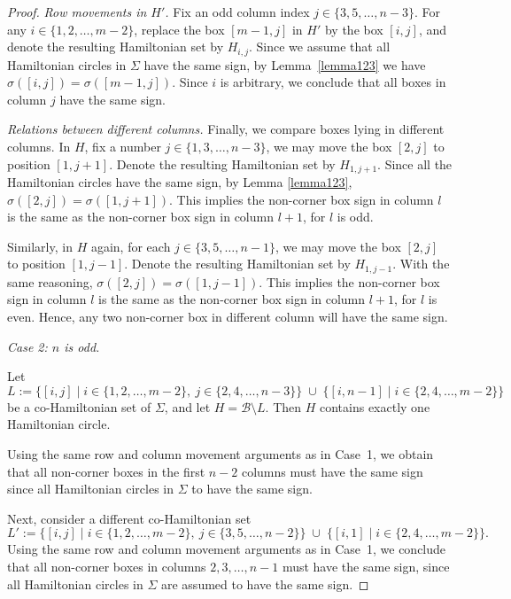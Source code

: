 \documentclass[12pt]{amsart}
\theoremstyle{theorem}%
\theoremstyle{definition}%
\begin{document}
\begin{proof}
\medskip
\noindent\emph{Row movements in $H'$.}
Fix an odd column index $j\in\{3,5,\dots,n-3\}$.
For any $i\in\{1,2,\dots,m-2\}$, replace the box $[m-1,j]$ in $H'$
by the box $[i,j]$, and denote the resulting Hamiltonian set by $H_{i,j}$. Since we assume that all Hamiltonian circles in $\Sigma$ have the same sign, by Lemma~\ref{lemma123} we have
$\sigma([i,j])=\sigma([m-1,j])$.
Since $i$ is arbitrary, we conclude that all boxes in column $j$ have the same sign.


\medskip
\noindent\emph{Relations between different columns.}
Finally, we compare boxes lying in different columns.
In $H$, fix a number $j\in\{1,3,\dots,n-3\}$, we may move the box $[2,j]$
to position $[1,j+1]$. Denote the resulting Hamiltonian set by $H_{1,j+1}$. Since all the Hamiltonian circles have the same sign, 
by Lemma \ref{lemma123}, $\sigma([2,j])=\sigma([1,j+1])$. This implies the non-corner box sign in column $l$ is the same as the non-corner box sign in column $l+1$, for $l$ is odd.

Similarly, in $H$ again,  for each $j\in\{3,5,\dots,n-1\}$, we may move the box $[2,j]$
to position $[1,j-1]$. Denote the resulting Hamiltonian set by $H_{1,j-1}$.
With the same reasoning, $\sigma([2,j])=\sigma([1,j-1])$.  This implies the non-corner box sign in column $l$ is the same as the non-corner box sign in column $l+1$, for $l$ is even.
Hence, any two non-corner box in different column will have the same sign. 




\medskip
\noindent\emph{Case 2: $n$ is odd.}

Let
\[
L:=\{[i,j]\mid i\in \{1,2,\dots,m-2\},\ j\in \{2,4,\dots,n-3\}\}
\;\cup\;
\{[i,n-1]\mid i\in \{2,4,\dots,m-2\}\}
\]
be a co-Hamiltonian set of $\Sigma$, and let $H=\mathcal{B}\setminus L$.
Then $H$ contains exactly one Hamiltonian circle.

Using the same row and column movement arguments as in Case~1,
we obtain that all non-corner boxes in the first $n-2$ columns
must have the same sign since all Hamiltonian circles in $\Sigma$
to have the same sign.

Next, consider a different co-Hamiltonian set
\[
L':=\{[i,j]\mid i\in \{1,2,\dots,m-2\},\ j\in \{3,5,\dots,n-2\}\}
\;\cup\;
\{[i,1]\mid i\in \{2,4,\dots,m-2\}\}.
\]
Using the same row and column movement arguments as in Case~1,
we conclude that all non-corner boxes in columns $2,3,\dots,n-1$
must have the same sign, since all Hamiltonian circles in $\Sigma$
are assumed to have the same sign.


\end{proof}
\end{document}
